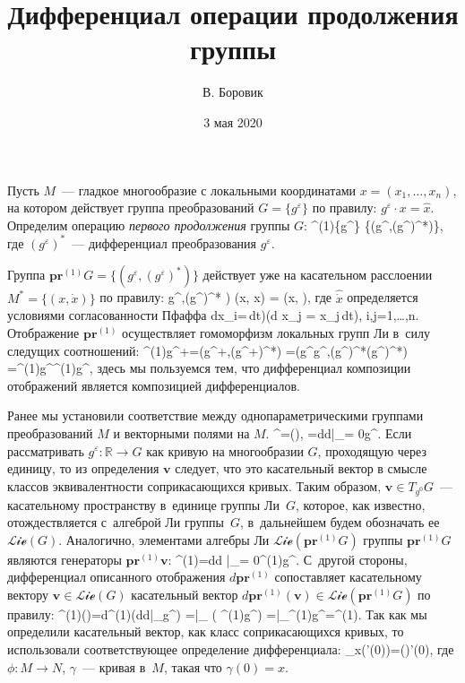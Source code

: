 \documentclass[a4paper,11pt]{article}
\title{Дифференциал операции продолжения группы}
\author{В. Боровик}
\date{3 мая 2020}
\def\[#1\]{\begin{align*}#1\end{align*}}
\newcommand{\pr}{\mathbf{pr}}
\newcommand{\vv}{\mathbf{v}}
\begin{document}
\maketitle
\sloppy

Пусть $M$~—  гладкое многообразие с локальными координатами $x =
(x_1,\ldots,x_n)$, на котором действует группа  преобразований $G=\{g^\varepsilon\}$ по правилу: $g^\varepsilon\cdot x=\hat x$.
Определим операцию \textit{первого продолжения\/} группы $G$:
	\[
	\pr^{(1)}\colon\{g^{\varepsilon}\} \rightarrow \{\left(g^{\varepsilon},(g^{\varepsilon})^*\right)\},
	\]
где $(g^{\varepsilon})^*$~— дифференциал преобразования $g^\varepsilon$.

Группа $\pr^{(1)}G = \{\left(g^{\varepsilon},(g^{\varepsilon})^* \right)\}$ действует уже на касательном расслоении $M^* = \{(x, \dot x)\}$ по правилу:
	\[
	(g^{\varepsilon},(g^{\varepsilon})^* ) \cdot (x, \dot x) = (\hat x, ),
	\]
где $\hat{\dot x}$ определяется условиями согласованности Пфаффа
	\[
	(d\hat x_i=\,dt)\bmod(d x_j = \dot x_j\,dt),
	\quad
	i,j=1,\ldots,n.
	\]
Отображение $\pr^{(1)}$ осуществляет гомоморфизм локальных групп Ли в~силу
следущих соотношений:
	\[
	\pr^{(1)}g^{\alpha+\beta}=\left(g^{\alpha+\beta},(g^{\alpha+\beta})^*\right)
		=(g^\beta\circ g^\alpha,(g^\beta)^*\circ(g^\alpha)^*)
		=\pr^{(1)}g^\alpha\circ\pr^{(1)}g^\beta,
	\]
здесь мы пользуемся тем, что дифференциал композиции отображений является
композицией дифференциалов.

Ранее мы установили соответствие между однопараметрическими группами
преобразований $M$ и векторными полями на $M$. 
	\[
	g^\varepsilon=(\varepsilon \vv),
	\quad
	\vv=\frac d{d\varepsilon}\bigg |_{\varepsilon = 0}g^{\varepsilon}.
	\]
Если рассматривать $g^\varepsilon\colon\mathbb{R}\to G$ как кривую на
многообразии $G$, проходящую через единицу, то из определения $\vv$ следует,
что это касательный вектор в смысле классов эквивалентности соприкасающихся
кривых. Таким образом, $\vv\in T_{g^0}G$~—  касательному пространству в~единице
группы Ли~$G$, которое, как известно, отождествляется с~алгеброй Ли группы~$G$,
в~дальнейшем будем обозначать ее $\mathcal{Lie}(G)$. Аналогично, элементами
алгебры Ли $\mathcal{Lie}(\pr^{(1)}G)$ группы $\pr^{(1)}G$ являются генераторы
$\pr^{(1)}\vv$:
	\[
	\pr^{(1)}\vv=\frac d{d \varepsilon}\bigg|_{\varepsilon = 0}\pr^{(1)}g^{\varepsilon}.
	\]
С~другой стороны, дифференциал описанного отображения $d\pr^{(1)}$ сопоставляет
касательному вектору $\vv\in\mathcal{Lie}(G)$ касательный вектор
$d\pr^{(1)}(\vv) \in \mathcal{Lie}(\pr^{(1)}G)$ по правилу:
	\[
	d\pr^{(1)}(\vv)=d\pr^{(1)}\left(\frac d{d\varepsilon}\bigg|_{}g^\varepsilon\right)
		=\bigg |_{} \left( \pr^{(1)}\circ g^\varepsilon\right)
		=\bigg |_{}\pr^{(1)}g^\varepsilon=\pr^{(1)}\vv.
	\]
Так как мы определили касательный вектор, как класс соприкасающихся кривых, то
использовали соответствующее определение дифференциала:
	\[
	d_x\phi(\gamma'(0))=(\phi \circ \gamma)'(0),
	\]
где $\phi\colon M\to N$, $\gamma$~— кривая в~$M$, такая что $\gamma(0)=x$.
\end{document}
